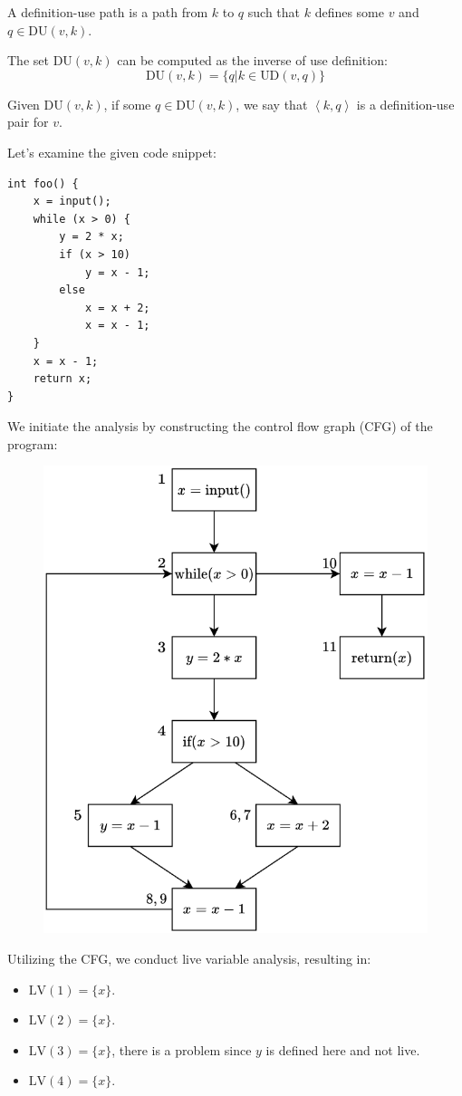 \begin{definition}
    A definition-use path is a path from $k$ to $q$ such that $k$ defines some $v$ and $q \in \text{DU}(v,k)$.
\end{definition}
The set $\text{DU}(v, k)$ can be computed as the inverse of use definition: 
\[ \text{DU}(v,k)=\{q|k \in \text{UD}(v,q)\}\]
\begin{definition}
    Given $\text{DU}(v,k)$, if some $q \in \text{DU}(v, k)$, we say that $\left\langle k,q \right\rangle $ is a definition-use pair for $v$.
\end{definition}
\begin{example}
    Let's examine the given code snippet:
    \begin{lstlisting}[style=Java]
int foo() {
    x = input();
    while (x > 0) {
        y = 2 * x;
        if (x > 10)
            y = x - 1;
        else
            x = x + 2;
            x = x - 1;
    }
    x = x - 1;
    return x;
}  
    \end{lstlisting}
    We initiate the analysis by constructing the control flow graph (CFG) of the program:
    \begin{figure}[H]
        \centering
        \includegraphics[width=0.5\linewidth]{images/cfg.png}
    \end{figure}
    Utilizing the CFG, we conduct live variable analysis, resulting in:
    \begin{itemize}
        \item $\text{LV}(1)=\{x\}$.
        \item $\text{LV}(2)=\{x\}$.
        \item $\text{LV}(3)=\{x\}$, there is a problem since $y$ is defined here and not live. 
        \item $\text{LV}(4)=\{x\}$.

\end{itemize}
\end{example}
